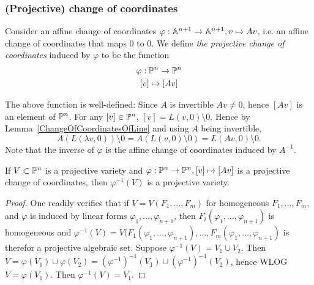     \subsubsection{(Projective) change of coordinates}
    \begin{definition}
        Consider an affine change of coordinates $\varphi: \mathbb{A}^{n+1}\rightarrow \mathbb{A}^{n+1}, v \mapsto Av$, i.e. an affine change of coordinates that maps $0$ to $0$. We define \textit{the projective change of coordinates} induced by $\varphi$ to be the function 
        \begin{gather*}
            \varphi : \mathbb{P}^n \rightarrow \mathbb{P}^n\\
            [v] \mapsto [Av]
        \end{gather*}
    \end{definition}
    \begin{remark}
        The above function is well-defined: Since $A$ is invertible $Av\neq 0$, hence $[Av]$ is an element of $\mathbb{P}^n$. For any $[v]\in \mathbb{P}^n$, $[v]=L(v,0)\setminus 0$. Hence by Lemma~\ref{ChangeOfCoordinatesOfLine} and using $A$ being invertible, 
        $$A(L(\lambda v,0))\setminus 0=A(L(v,0)\setminus 0)=L(Av,0)\setminus 0. $$
        Note that the inverse of $\varphi$ is the affine change of coordinates induced by $A^{-1}$.
    \end{remark}
    \begin{lemma}\label{ProjectiveChangeOfCoordinatesAndVarieties}
        If $V\subset \mathbb{P}^n$ is a projective variety and $\varphi : \mathbb{P}^n \rightarrow \mathbb{P}^n, [v]\mapsto [Av]$ is a projective change of coordinates, then $\varphi^{-1}(V)$ is a projective variety.
    \end{lemma}
    \begin{proof}
        One readily verifies that if $V=V(F_1,\dots,F_m)$ for homogeneous $F_1,\dots,F_m$, and $\varphi$ is induced by linear forms $\varphi_1,\dots,\varphi_{n+1}$, then $F_i(\varphi_1,\dots,\varphi_{n+1})$ is homogeneous and $\varphi^{-1}(V)=V(F_1(\varphi_1,\dots,\varphi_{n+1}),\dots,F_m(\varphi_1,\dots,\varphi_{n+1})$ is therefor a projective algebraic set. Suppose $\varphi^{-1}(V)=V_1\cup V_2$. Then $V = \varphi(V_1)\cup \varphi(V_2)=(\varphi^{-1})^{-1}(V_1)\cup (\varphi^{-1})^{-1}(V_2)$, hence WLOG $V=\varphi(V_1)$. Then $\varphi^{-1}(V)=V_1.$
    \end{proof}
